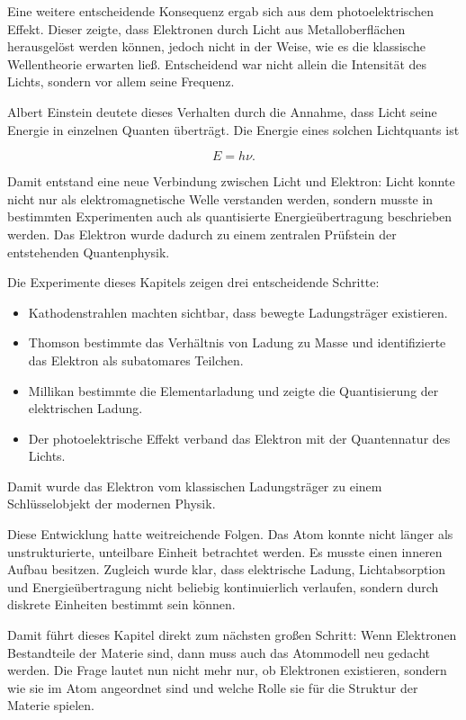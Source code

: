 Eine weitere entscheidende Konsequenz ergab sich aus dem photoelektrischen
Effekt. Dieser zeigte, dass Elektronen durch
Licht aus Metalloberflächen herausgelöst werden können, jedoch nicht in der
Weise, wie es die klassische Wellentheorie erwarten ließ. Entscheidend war
nicht allein die Intensität des Lichts, sondern vor allem seine Frequenz.

Albert Einstein deutete dieses Verhalten durch die
Annahme, dass Licht seine Energie in einzelnen Quanten überträgt. Die Energie
eines solchen Lichtquants ist

\[
E = h \nu.
\]

Damit entstand eine neue Verbindung zwischen Licht und Elektron: Licht konnte
nicht nur als elektromagnetische Welle verstanden werden, sondern musste in
bestimmten Experimenten auch als quantisierte Energieübertragung beschrieben
werden. Das Elektron wurde dadurch zu einem zentralen Prüfstein der entstehenden
Quantenphysik.

\begin{DidacticBox}
	\label{box:vom-klassischen-teilchen-zum-quantenteilchen}
	Die Experimente dieses Kapitels zeigen drei entscheidende Schritte:
	\begin{itemize}
		\item Kathodenstrahlen machten sichtbar, dass bewegte Ladungsträger existieren.
		\item Thomson bestimmte das Verhältnis von Ladung zu Masse und identifizierte
		das Elektron als subatomares Teilchen.
		\item Millikan bestimmte die Elementarladung und zeigte die Quantisierung der
		elektrischen Ladung.
		\item Der photoelektrische Effekt verband das Elektron mit der Quantennatur
		des Lichts.
	\end{itemize}
	Damit wurde das Elektron vom klassischen Ladungsträger zu einem Schlüsselobjekt
	der modernen Physik.
\end{DidacticBox}

Diese Entwicklung hatte weitreichende Folgen. Das Atom konnte nicht länger als
unstrukturierte, unteilbare Einheit betrachtet werden. Es musste einen inneren
Aufbau besitzen. Zugleich wurde klar, dass elektrische Ladung, Lichtabsorption
und Energieübertragung nicht beliebig kontinuierlich verlaufen, sondern durch
diskrete Einheiten bestimmt sein können.

Damit führt dieses Kapitel direkt zum nächsten großen Schritt: Wenn Elektronen
Bestandteile der Materie sind, dann muss auch das Atommodell neu gedacht werden.
Die Frage lautet nun nicht mehr nur, ob Elektronen existieren, sondern wie sie
im Atom angeordnet sind und welche Rolle sie für die Struktur der Materie
spielen.